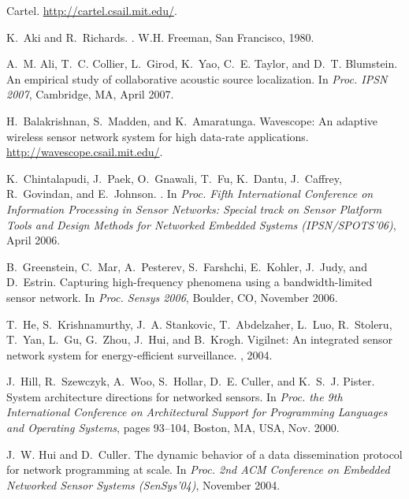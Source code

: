 \documentclass[lettersize]{sig-alternate-konrad}
\begin{document}
\begin{thebibliography}{10}

Cartel.
\newblock \url{http://cartel.csail.mit.edu/}.

K.~Aki and R.~Richards.
.
\newblock W.H. Freeman, San Francisco, 1980.

A.~M. Ali, T.~C. Collier, L.~Girod, K.~Yao, C.~E. Taylor, and D.~T. Blumstein.
\newblock An empirical study of collaborative acoustic source localization.
\newblock In {\em Proc. IPSN 2007}, Cambridge, MA, April 2007.

H.~Balakrishnan, S.~Madden, and K.~Amaratunga.
\newblock Wavescope: An adaptive wireless sensor network system for high
  data-rate applications.
\newblock \url{http://wavescope.csail.mit.edu/}.

K.~Chintalapudi, J.~Paek, O.~Gnawali, T.~Fu, K.~Dantu, J.~Caffrey, R.~Govindan,
  and E.~Johnson.
.
\newblock In {\em Proc. Fifth International Conference on Information
  Processing in Sensor Networks: Special track on Sensor Platform Tools and
  Design Methods for Networked Embedded Systems (IPSN/SPOTS'06)}, April 2006.

B.~Greenstein, C.~Mar, A.~Pesterev, S.~Farshchi, E.~Kohler, J.~Judy, and
  D.~Estrin.
\newblock Capturing high-frequency phenomena using a bandwidth-limited sensor
  network.
\newblock In {\em Proc. Sensys 2006}, Boulder, CO, November 2006.

T.~He, S.~Krishnamurthy, J.~A. Stankovic, T.~Abdelzaher, L.~Luo, R.~Stoleru,
  T.~Yan, L.~Gu, G.~Zhou, J.~Hui, and B.~Krogh.
\newblock Vigilnet: An integrated sensor network system for energy-efficient
  surveillance.
, 2004.

J.~Hill, R.~Szewczyk, A.~Woo, S.~Hollar, D.~E. Culler, and K.~S.~J. Pister.
\newblock System architecture directions for networked sensors.
\newblock In {\em Proc. the 9th International Conference on Architectural
  Support for Programming Languages and Operating Systems}, pages 93--104,
  Boston, MA, USA, Nov. 2000.

J.~W. Hui and D.~Culler.
\newblock The dynamic behavior of a data dissemination protocol for network
  programming at scale.
\newblock In {\em Proc. 2nd ACM Conference on Embedded Networked Sensor Systems
  (SenSys'04)}, November 2004.


\end{thebibliography}
\end{document}
